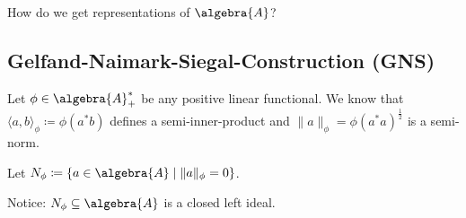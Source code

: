 \documentclass[a4paper]{article}
\begin{document}
How do we get representations of $\algebra{A}$?

\subsection*{Gelfand-Naimark-Siegal-Construction (GNS)}

\begin{theorem}
Let $\phi \in \algebra{A}_+^*$ be any positive linear functional. 
We know that $\langle a, b \rangle_\phi \coloneq \phi(a^* b)$ defines a semi-inner-product and $\|a\|_\phi = \phi(a^* a)^\frac{1}{2}$ is a semi-norm.

Let $N_\phi \coloneq \{a \in \algebra{A} \mid \|a\|_\phi = 0 \}$. 
\end{theorem}

\begin{remark}
Notice: $N_\phi \subseteq \algebra{A}$ is a closed left ideal.
\end{remark}
\end{document}
